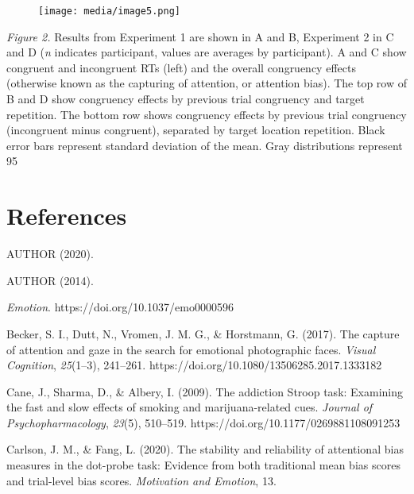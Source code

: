 \documentclass{article}
\begin{document}
{	\begin{figure}
		\caption{}

		\label{fig:rId15}

		\texttt{[image: media/image5.png]}
	\end{figure}



	\emph{Figure 2. }Results from Experiment 1 are shown in A and B, Experiment 2 in C and D (\emph{n} indicates participant, values are averages by participant). A and C show congruent and incongruent RTs (left) and the overall congruency effects (otherwise known as the capturing of attention, or attention bias). The top row of B and D show congruency effects by previous trial congruency and target repetition. The bottom row shows congruency effects by previous trial congruency (incongruent minus congruent), separated by target location repetition. Black error bars represent standard deviation of the mean. Gray distributions represent 95%







	\section{References}



	AUTHOR (2020).



	AUTHOR (2014).



	\emph{Emotion}. https://doi.org/10.1037/emo0000596



	Becker, S. I., Dutt, N., Vromen, J. M. G., & Horstmann, G. (2017). The capture of attention and gaze in the search for emotional photographic faces. \emph{Visual Cognition}, \emph{25}(1–3), 241–261. https://doi.org/10.1080/13506285.2017.1333182



	Cane, J., Sharma, D., & Albery, I. (2009). The addiction Stroop task: Examining the fast and slow effects of smoking and marijuana-related cues. \emph{Journal of Psychopharmacology}, \emph{23}(5), 510–519. https://doi.org/10.1177/0269881108091253



	Carlson, J. M., & Fang, L. (2020). The stability and reliability of attentional bias measures in the dot-probe task: Evidence from both traditional mean bias scores and trial-level bias scores. \emph{Motivation and Emotion}, 13.



}
\end{document}
